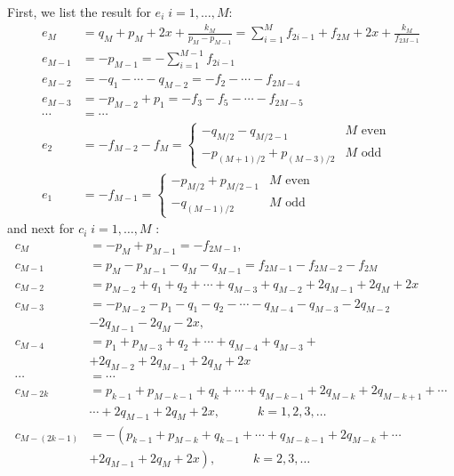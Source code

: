 \documentclass[12pt]{article}
\numberwithin{equation}{section}
\def\lab#1{\label{eq:#1}}
\begin{document}
First, we list the result for $e_i \; i=1, {\ldots}, M$:
\begin{equation}
\begin{split}
e_M &= q_M+p_M+2x+\frac{k_M}{p_M-p_{M-1}}= \sum_{i=1}^M f_{2i-1}+f_{2M}
+2x+\frac{k_M}{f_{2M-1}}\\
e_{M-1} &= -p_{M-1}= -\sum_{i=1}^{M-1} f_{2i-1}\\
e_{M-2}&=-q_1-\cdots -q_{M-2}=-f_2-\cdots - f_{2M-4}\\
e_{M-3}&=-p_{M-2}+p_1=-f_3-f_5-\cdots-f_{2M-5}\\
\cdots &= \cdots \\
e_2&=-f_{M-2}-f_{M} =\begin{cases} -q_{M/2}-q_{M/2-1} & \text{$M$ even}\\
-p_{(M+1)/2}+p_{(M-3)/2} & \text{$M$ odd}
\end{cases}\\
e_1&= - f_{M-1}= \begin{cases} -p_{M/2}+p_{M/2-1} & \text{$M$ even}\\
-q_{(M-1)/2} & \text{$M$ odd}
\end{cases}
\end{split}
\lab{eMM}
\end{equation}
and next for $c_i \; i=1, {\ldots}, M$ :
\begin{equation}
\begin{split}
c_M &= -p_M+p_{M-1}=-f_{2M-1},\\
c_{M-1}& =p_M-p_{M-1}-q_M-q_{M-1} =f_{2M-1} -f_{2M-2}-f_{2M}\\
c_{M-2} &= p_{M-2}+q_1+q_2+ \cdots+q_{M-3} +q_{M-2}+2 q_{M-1}+2 q_{M}+2x\\
c_{M-3} &=- p_{M-2}-p_{1}-q_1-q_2 -\cdots-q_{M-4}-
q_{M-3}-2q_{M-2}
\\&-2q_{M-1}-2q_M-2x, \\
c_{M-4} &=p_1+p_{M-3}+q_2+\cdots+q_{M-4}+q_{M-3}+\\&+2q_{M-2}+2q_{M-1}+2q_M+2x\\
\cdots &= \cdots \\
c_{M-2k} &= p_{k-1}+p_{M-k-1}+q_k + \cdots + q_{M-k-1} + 2 q_{M-k}
+2q_{M-k+1}
+\cdots \\
&\cdots+2q_{M-1}+2q_M+2x, \quad\qquad k=1,2,3,{\ldots} \\
c_{M-(2k-1)} &=-\left(p_{k-1}+p_{M-k}+q_{k-1}+\cdots+q_{M-k-1}
+2q_{M-k}+\cdots \right.
\\  &\left.+2q_{M-1}+2q_M+2x\right), \quad\qquad k=2,3,{\ldots} 
\end{split}
\lab{cMM}
\end{equation}
\end{document}
